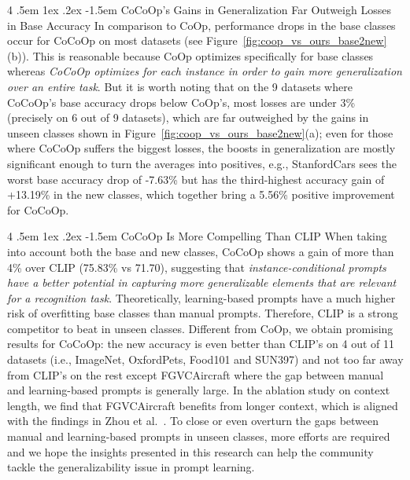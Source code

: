 \documentclass[10pt,twocolumn,letterpaper]{article}
\makeatletter
\renewcommand\paragraph{
  \@startsection{paragraph} %
  {4} %
  {\z@} %
  {.5em \@plus1ex \@minus.2ex} %
  {-1.5em} %
  {\normalfont\normalsize\bfseries} %
}
\makeatother
\begin{document}
\paragraph{CoCoOp's Gains in Generalization Far Outweigh Losses in Base Accuracy}
In comparison to CoOp, performance drops in the base classes occur for CoCoOp on most datasets (see Figure~\ref{fig:coop_vs_ours_base2new}(b)). This is reasonable because CoOp optimizes specifically for base classes whereas \emph{CoCoOp optimizes for each instance in order to gain more generalization over an entire task}. But it is worth noting that on the 9 datasets where CoCoOp's base accuracy drops below CoOp's, most losses are under 3\% (precisely on 6 out of 9 datasets), which are far outweighed by the gains in unseen classes shown in Figure~\ref{fig:coop_vs_ours_base2new}(a); even for those where CoCoOp suffers the biggest losses, the boosts in generalization are mostly significant enough to turn the averages into positives, e.g., StanfordCars sees the worst base accuracy drop of -7.63\% but has the third-highest accuracy gain of +13.19\% in the new classes, which together bring a 5.56\% positive improvement for CoCoOp.

\paragraph{CoCoOp Is More Compelling Than CLIP}
When taking into account both the base and new classes, CoCoOp shows a gain of more than 4\% over CLIP (75.83\% vs 71.70), suggesting that \emph{instance-conditional prompts have a better potential in capturing more generalizable elements that are relevant for a recognition task}. Theoretically, learning-based prompts have a much higher risk of overfitting base classes than manual prompts. Therefore, CLIP is a strong competitor to beat in unseen classes. Different from CoOp, we obtain promising results for CoCoOp: the new accuracy is even better than CLIP's on 4 out of 11 datasets (i.e., ImageNet, OxfordPets, Food101 and SUN397) and not too far away from CLIP's on the rest except FGVCAircraft where the gap between manual and learning-based prompts is generally large. In the ablation study on context length, we find that FGVCAircraft benefits from longer context, which is aligned with the findings in Zhou et al.~\cite{zhou2021coop}. To close or even overturn the gaps between manual and learning-based prompts in unseen classes, more efforts are required and we hope the insights presented in this research can help the community tackle the generalizability issue in prompt learning.
\end{document}
